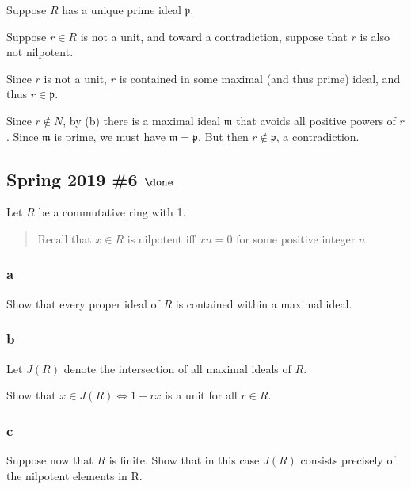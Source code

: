 \begin{solution}
Suppose \(R\) has a unique prime ideal \(\mathfrak{p}\).

Suppose \(r\in R\) is not a unit, and toward a contradiction, suppose
that \(r\) is also not nilpotent.

Since \(r\) is not a unit, \(r\) is contained in some maximal (and thus
prime) ideal, and thus \(r \in \mathfrak{p}\).

Since \(r\not\in N\), by (b) there is a maximal ideal \(\mathfrak{m}\)
that avoids all positive powers of \(r\). Since \(\mathfrak{m}\) is
prime, we must have \(\mathfrak{m} = \mathfrak{p}\). But then
\(r\not\in \mathfrak{p}\), a contradiction.

\end{solution}

\hypertarget{spring-2019-6-done}{%
\subsection{\texorpdfstring{Spring 2019 \#6
\(\done\)}{Spring 2019 \#6 \textbackslash done}}\label{spring-2019-6-done}}

Let \(R\) be a commutative ring with 1.

\begin{quote}
Recall that \(x \in R\) is nilpotent iff \(xn = 0\) for some positive
integer \(n\).
\end{quote}

\hypertarget{a-35}{%
\subsubsection{a}\label{a-35}}

Show that every proper ideal of \(R\) is contained within a maximal
ideal.

\hypertarget{b-25}{%
\subsubsection{b}\label{b-25}}

Let \(J(R)\) denote the intersection of all maximal ideals of \(R\).

Show that \(x \in J(R) \iff 1 + rx\) is a unit for all \(r \in R\).

\hypertarget{c-18}{%
\subsubsection{c}\label{c-18}}

Suppose now that \(R\) is finite. Show that in this case \(J(R)\)
consists precisely of the nilpotent elements in R.

